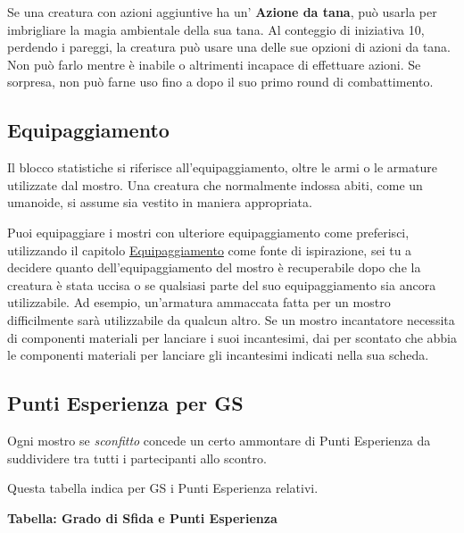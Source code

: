 \begin{multicols}{2}
Se una creatura con azioni aggiuntive ha un' \textbf{Azione da tana}, può usarla per imbrigliare la magia ambientale della sua tana. Al conteggio di iniziativa 10, perdendo i pareggi, la creatura può usare una delle sue opzioni di azioni da tana. Non può farlo mentre è inabile o altrimenti incapace di effettuare azioni. Se sorpresa, non può farne uso fino a dopo il suo primo round di combattimento.




\subsection{Equipaggiamento}

Il blocco statistiche si riferisce all'equipaggiamento, oltre le armi o le armature utilizzate dal mostro. Una creatura che normalmente indossa abiti, come un umanoide, si assume sia vestito in maniera appropriata.

Puoi equipaggiare i mostri con ulteriore equipaggiamento come preferisci, utilizzando il capitolo \hyperlink{equipaggiamento}{Equipaggiamento} come fonte di ispirazione, sei tu a decidere quanto dell'equipaggiamento del mostro è recuperabile dopo che la creatura è stata uccisa o se qualsiasi parte del suo equipaggiamento sia ancora utilizzabile. Ad esempio, un'armatura ammaccata fatta per un mostro difficilmente sarà utilizzabile da qualcun altro. Se un mostro incantatore necessita di componenti materiali per lanciare i suoi incantesimi, dai per scontato che abbia le componenti materiali per lanciare gli incantesimi indicati nella sua scheda.


\subsection{Punti Esperienza per GS}

Ogni mostro se \emph{sconfitto} concede un certo ammontare di Punti Esperienza da suddividere tra tutti i partecipanti allo scontro.

Questa tabella indica per GS i Punti Esperienza relativi.

\medskip


\textbf{Tabella: Grado di Sfida e Punti Esperienza}


\end{multicols}
